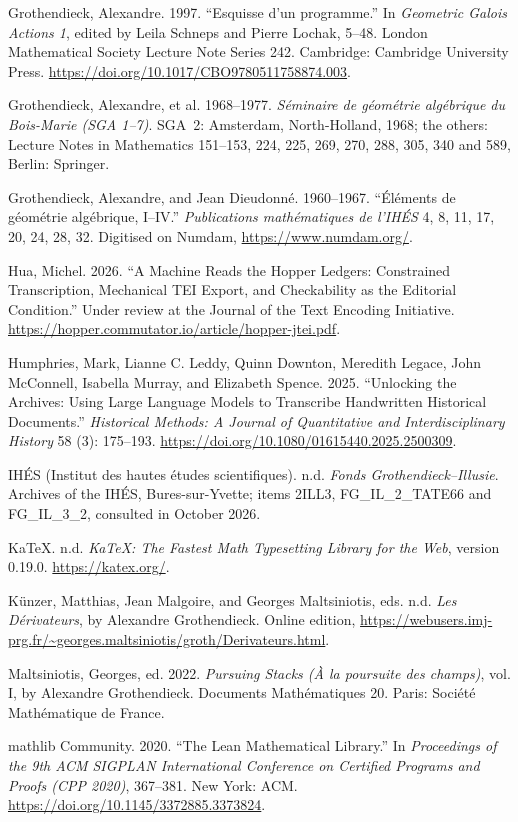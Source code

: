 \documentclass[11pt]{article}
\newcommand{\qq}[1]{“#1”}
\begin{document}
\begin{list}{}{\setlength{\leftmargin}{1.5em}\setlength{\itemindent}{-1.5em}\setlength{\itemsep}{3pt}}
\item Grothendieck, Alexandre. 1997. \qq{Esquisse d'un programme.} In \emph{Geometric Galois Actions 1}, edited by Leila Schneps and Pierre Lochak, 5--48. London Mathematical Society Lecture Note Series 242. Cambridge: Cambridge University Press. \url{https://doi.org/10.1017/CBO9780511758874.003}.
\item Grothendieck, Alexandre, et al. 1968--1977. \emph{Séminaire de géométrie algébrique du Bois-Marie (SGA 1--7)}. SGA~2: Amsterdam, North-Holland, 1968; the others: Lecture Notes in Mathematics 151--153, 224, 225, 269, 270, 288, 305, 340 and 589, Berlin: Springer.
\item Grothendieck, Alexandre, and Jean Dieudonné. 1960--1967. \qq{Éléments de géométrie algébrique, I--IV.} \emph{Publications mathématiques de l'IHÉS} 4, 8, 11, 17, 20, 24, 28, 32. Digitised on Numdam, \url{https://www.numdam.org/}.
\item Hua, Michel. 2026. \qq{A Machine Reads the Hopper Ledgers: Constrained Transcription, Mechanical TEI Export, and Checkability as the Editorial Condition.} Under review at the Journal of the Text Encoding Initiative. \url{https://hopper.commutator.io/article/hopper-jtei.pdf}.
\item Humphries, Mark, Lianne C. Leddy, Quinn Downton, Meredith Legace, John McConnell, Isabella Murray, and Elizabeth Spence. 2025. \qq{Unlocking the Archives: Using Large Language Models to Transcribe Handwritten Historical Documents.} \emph{Historical Methods: A Journal of Quantitative and Interdisciplinary History} 58 (3): 175--193. \url{https://doi.org/10.1080/01615440.2025.2500309}.
\item IHÉS (Institut des hautes études scientifiques). n.d. \emph{Fonds Grothendieck--Illusie}. Archives of the IHÉS, Bures-sur-Yvette; items 2ILL3, FG\_IL\_2\_TATE66 and FG\_IL\_3\_2, consulted in October 2026.
\item KaTeX. n.d. \emph{KaTeX: The Fastest Math Typesetting Library for the Web}, version 0.19.0. \url{https://katex.org/}.
\item Künzer, Matthias, Jean Malgoire, and Georges Maltsiniotis, eds. n.d. \emph{Les Dérivateurs}, by Alexandre Grothendieck. Online edition, \url{https://webusers.imj-prg.fr/~georges.maltsiniotis/groth/Derivateurs.html}.
\item Maltsiniotis, Georges, ed. 2022. \emph{Pursuing Stacks (À la poursuite des champs)}, vol. I, by Alexandre Grothendieck. Documents Mathématiques 20. Paris: Société Mathématique de France.
\item mathlib Community. 2020. \qq{The Lean Mathematical Library.} In \emph{Proceedings of the 9th ACM SIGPLAN International Conference on Certified Programs and Proofs (CPP 2020)}, 367--381. New York: ACM. \url{https://doi.org/10.1145/3372885.3373824}.

\end{list}
\end{document}
